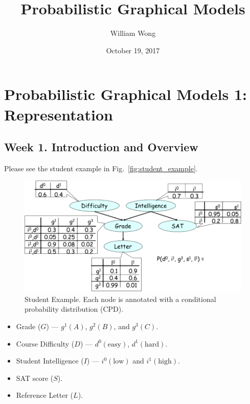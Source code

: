 \documentclass[12pt]{article}
\begin{document}
\title{Probabilistic Graphical Models}

\author{William Wong}
\date{October 19, 2017}

\maketitle


\section{Probabilistic Graphical Models 1: Representation}

\subsection{Week 1. Introduction and Overview}

Please see the student example in Fig.~\ref{fig:student_example}.

\begin{figure}[H]
\centering
\includegraphics[width=6.5in]{graphics/example_student.png}
\caption{Student Example. Each node is annotated with a conditional probability distribution (CPD).}
\label{fig:example_student}
\end{figure}


\begin{itemize}
    \item Grade ($G$) --- $g^1(A)$, $g^2(B)$, and $g^3(C)$.
    \item Course Difficulty ($D$) --- $d^0(\text{easy})$, $d^1(\text{hard})$.
    \item Student Intelligence ($I$) --- $i^0(\text{low})$ and $i^1(\text{high})$.
    \item SAT score ($S$).
    \item Reference Letter ($L$).
\end{itemize}
 
\end{document}
